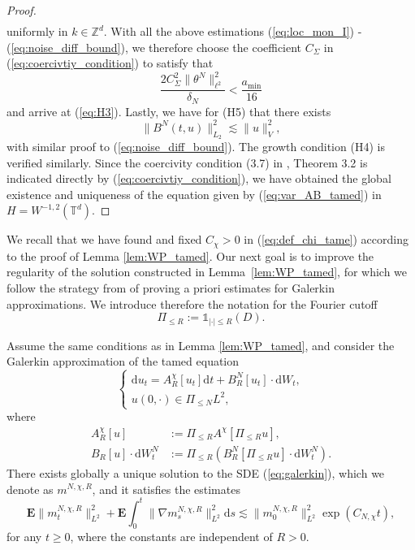 \begin{proof}
\begin{align*}
\end{align*}
uniformly in $k \in \mathbb{Z}^d$. With all the above estimations (\ref{eq:loc_mon_I}) - (\ref{eq:noise_diff_bound}), we therefore choose the coefficient $C_{\Sigma}$ in (\ref{eq:coercivtiy_condition}) to satisfy that 
\begin{equation}\label{eq:CSigma-choice1}
    \frac{2C^2_{\Sigma}\|\theta^N\|^2_{\ell^2}}{\delta_N} < \frac{a_{\min}}{16}
\end{equation}
and arrive at (\ref{eq:H3}). Lastly, we have for (H5) that
there exists 
\begin{equation}\label{eq:H5}
\big\| B^N(t,u)\big\|^2_{L_2} \lesssim \|u\|_V^2,
\end{equation}
with similar proof to (\ref{eq:noise_diff_bound}). The growth condition (H4) is verified similarly. Since the coercivity condition (3.7) in \cite{RSZ22}, Theorem 3.2 is indicated directly by (\ref{eq:coercivtiy_condition}), we have obtained the global existence and uniqueness of the equation given by (\ref{eq:var_AB_tamed}) in $H = W^{-1,2}(\mathbb{T}^d)$.
\end{proof}

We recall that we have found and fixed $C_{\chi} > 0$ in (\ref{eq:def_chi_tame}) according to the proof of Lemma \ref{lem:WP_tamed}. Our next goal is to improve the regularity of the solution constructed in Lemma~\ref{lem:WP_tamed}, for which we follow the strategy from \cite[Proposition~1]{DKP23} of proving a priori estimates for Galerkin approximations.  
We introduce therefore the notation for the Fourier cutoff
\[
   \Pi_{\leq R} := \mathds{1}_{|\cdot| \leq R}(D).
\]

\begin{lem}\label{lem:energy_galerkin} Assume the same conditions as in Lemma \ref{lem:WP_tamed}, and consider the Galerkin approximation of the tamed equation
\begin{equation}\label{eq:galerkin}
\begin{cases}
        \mathrm{d}u_t=A_{R}^{\chi}[u_t]\mathrm{d}t + B_{R}^N[u_t]\cdot\mathrm{d}W_t,\\
       u(0,\cdot) \in  \Pi_{\leq N}L^2,
    \end{cases}
\end{equation}
where 
\begin{equation*}
\begin{split}
A^{\chi}_R[u] & :=\Pi_{\leq R}A^{\chi}[\Pi_{\leq R}u],\\
B_R[u]\cdot \mathrm{d}W^N_t & := \Pi_{\leq R}(B_R^N[\Pi_{\leq R}u]\cdot \mathrm{d}W^N_t). 
\end{split}
\end{equation*}
There exists globally a unique solution to the SDE (\ref{eq:galerkin}), which we denote as $m^{N,\chi,R}$, and it satisfies the estimates
\begin{equation}\label{eq:L2_bounds_galerkin}
\mathbf{E}\|m_t^{N,\chi,R}\|^2_{L^2} + \mathbf{E}\int_0^t \|\nabla m_s^{N,\chi,R}\|^2_{L^2}\mathrm{d}s \lesssim  \|m_0^{N,\chi,R}\|^2_{L^2}  \exp(C_{N,\chi}t),
\end{equation}
for any $t \geq 0$, where the constants are independent of $R > 0$.
\end{lem}

